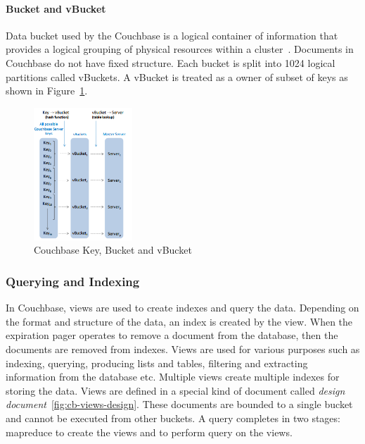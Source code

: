 \paragraph{Bucket and vBucket}
 Data bucket used by the Couchbase is a logical container of information that provides a logical grouping of physical resources within a cluster~\citep{lichtenberg2013nosql}. Documents in Couchbase do not have fixed structure. Each bucket is split into 1024 logical partitions called vBuckets. A vBucket is treated as a owner of subset of keys as shown in Figure~\ref{fig:cb-vbucket}.  

\begin{figure}[h]
	\centering
	\includegraphics[width=0.33\textwidth]{img/vbucket2}
	\caption{ Couchbase Key, Bucket and   vBucket ~\cite{couchbasedocs}}
	\label{fig:cb-vbucket}
\end{figure}




\subsubsection{Querying and Indexing}

 In Couchbase, views are used to create indexes and query the data. Depending on the format and structure of the data, an index is created by the view. When the expiration pager operates to remove a document from the database, then the documents are removed from indexes. Views are used for various purposes such as indexing, querying, producing lists and tables, filtering and extracting information from the database etc. Multiple views create multiple indexes for storing the data. Views are defined in a special kind of document called \textit{design document}~\ref{fig:cb-views-design}. These documents are bounded to a single bucket and cannot be executed from other buckets. A query completes in two stages: mapreduce to create the views and to perform query on the views.
 

